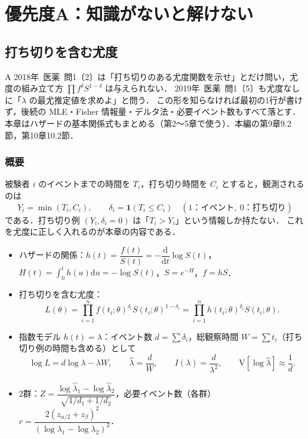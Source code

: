\documentclass[a4paper,11pt,openany]{ltjsbook}
\newcommand{\kakomon}[2]{\mbox{#1年 医薬 問#2}}
\newcommand{\V}{\mathrm{V}}
\newcommand{\dd}{\mathrm{d}}
\newcommand{\ind}{\mathbf{1}}
\begin{document}
\clearpage\makeatletter\@mainmattertrue\makeatother
{}

\part*{優先度A：知識がないと解けない}

\chapter{打ち切りを含む尤度}\label{ch:m01}

\begin{priobox}{A}
\kakomon{2018}{1}〔2〕は「打ち切りのある尤度関数を示せ」とだけ問い，尤度の組み立て方 $\prod f^{\delta}S^{1-\delta}$ は与えられない．
\kakomon{2019}{1}〔5〕も尤度なしに「$\lambda$ の最尤推定値を求めよ」と問う．
この形を知らなければ最初の1行が書けず，後続の MLE・Fisher 情報量・デルタ法・必要イベント数もすべて落とす．
本章はハザードの基本関係式もまとめる（第2〜5章で使う）．本編の第9章9.2節，第10章10.2節．
\end{priobox}

\section{概要}\label{sec:m01-gaiyo}
被験者 $i$ のイベントまでの時間を $T_i$，打ち切り時間を $C_i$ とすると，観測されるのは
\[
Y_i=\min(T_i,C_i),\qquad \delta_i=\ind(T_i\le C_i)\quad(1\text{：イベント},\ 0\text{：打ち切り})
\]
である．打ち切り例 $(Y_i,\delta_i=0)$ は「$T_i>Y_i$」という情報しか持たない．
これを尤度に正しく入れるのが本章の内容である．

\begin{pointbox}[覚える式]
\begin{itemize}
\item ハザードの関係：$h(t)=\dfrac{f(t)}{S(t)}=-\dfrac{\dd}{\dd t}\log S(t)$，\quad $H(t)=\int_0^th(u)\dd u=-\log S(t)$，\quad $S=e^{-H}$，\quad $f=hS$．
\item 打ち切りを含む尤度：
\[
L(\theta)=\prod_{i=1}^nf(t_i;\theta)^{\delta_i}S(t_i;\theta)^{1-\delta_i}=\prod_{i=1}^nh(t_i;\theta)^{\delta_i}S(t_i;\theta).
\]
\item 指数モデル $h(t)=\lambda$：イベント数 $d=\sum\delta_i$，総観察時間 $W=\sum t_i$（打ち切り例の時間も含める）として
\[
\log L=d\log\lambda-\lambda W,\qquad \hat\lambda=\frac dW,\qquad I(\lambda)=\frac{d}{\lambda^2},\qquad \V[\log\hat\lambda]\approx\frac1d .
\]
\item 2群：$Z=\dfrac{\log\hat\lambda_1-\log\hat\lambda_2}{\sqrt{1/d_1+1/d_2}}$，\quad 必要イベント数（各群）$r=\dfrac{2(z_{\alpha/2}+z_\beta)^2}{(\log\lambda_1-\log\lambda_2)^2}$．
\end{itemize}
\end{pointbox}
\end{document}
